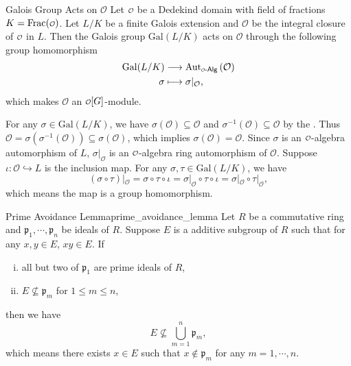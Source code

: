 \begin{proposition}{Galois Group Acts on $\mathcal{O}$}{}
    Let $\mathcalo$ be a Dedekind domain with field of fractions $K=\mathrm{Frac}(\mathcalo)$. Let $L/K$ be a finite Galois extension and $\mathcal{O}$ be the integral closure of $\mathcalo$ in $L$. Then the Galois group $\mathrm{Gal}(L/K)$ acts on $\mathcal{O}$ through the following group homomorphism
    \begin{align*}
        \mathrm{Gal}(L/K)&\longrightarrow \mathrm{Aut}_{\mathcalo\text{-}\mathsf{Alg}}\left(\mathcal{O}\right)\\
        \sigma&\longmapsto \sigma|_{\mathcal{O}},
    \end{align*}
    which makes $\mathcal{O}$ an $\mathcalo[G]$-module.
\end{proposition}
\begin{prf}
    For any $\sigma\in \mathrm{Gal}(L/K)$, we have $\sigma(\mathcal{O})\subseteq \mathcal{O}$ and $ \sigma^{-1}(\mathcal{O})\subseteq \mathcal{O}$ by the . Thus $\mathcal{O}= \sigma(\sigma^{-1}(\mathcal{O}))\subseteq \sigma(\mathcal{O})$, which implies $\sigma(\mathcal{O})=\mathcal{O}$. Since $\sigma$ is an $\mathcalo$-algebra automorphism of $L$, $\sigma|_{\mathcal{O}}$ is an $\mathcalo$-algebra ring automorphism of $\mathcal{O}$. Suppose $\iota:\mathcal{O}\hookrightarrow L$ is the inclusion map. For any $\sigma,\tau\in \mathrm{Gal}(L/K)$, we have
    \[
        (\sigma\circ \tau)|_{\mathcal{O}}=\sigma\circ \tau\circ \iota=\sigma|_{\mathcal{O}} \circ \tau\circ \iota =\sigma|_{\mathcal{O}}\circ \tau|_{\mathcal{O}},
    \]
    which means the map is a group homomorphism.
\end{prf}

\begin{lemma}{Prime Avoidance Lemma}{prime_avoidance_lemma}
    Let $R$ be a commutative ring and $\mathfrak{p}_1,\cdots,\mathfrak{p}_n$ be ideals of $R$. Suppose $E$ is a additive subgroup of $R$ such that for any $x,y \in E$, $xy \in E$. If
    \begin{enumerate}[(i)]
        \item all but two of $\mathfrak{p}_1$ are prime ideals of $R$,
        \item $E \not\subseteq \mathfrak{p}_m$ for $1\le m\le n$,
    \end{enumerate}
    then we have 
    \[
    E \not\subseteq \bigcup_{m=1}^n \mathfrak{p}_m,
    \]
    which means there exists $x\in E$ such that $x\notin \mathfrak{p}_m$ for any $m=1,\cdots,n$.
\end{lemma}

